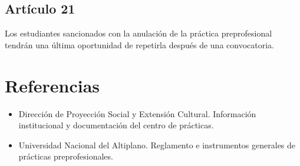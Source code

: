 \documentclass[12pt,a4paper]{article}
\begin{document}
\subsection*{Artículo 21}
Los estudiantes sancionados con la anulación de la práctica preprofesional tendrán una última oportunidad de repetirla después de una convocatoria.

\section{Referencias}
\begin{itemize}
  \item Dirección de Proyección Social y Extensión Cultural. Información institucional y documentación del centro de prácticas.
  \item Universidad Nacional del Altiplano. Reglamento e instrumentos generales de prácticas preprofesionales.
\end{itemize}
\end{document}
